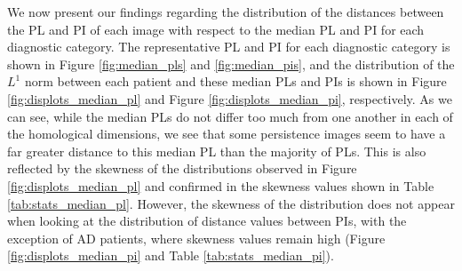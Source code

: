\documentclass{article}
\begin{document}
We now present our findings regarding the distribution of the distances between the PL and PI of
each image with respect to the median PL and PI for each diagnostic category. The representative PL
and PI for each diagnostic category is shown in Figure \ref{fig:median_pls} and
\ref{fig:median_pis}, and the distribution of the $L^1$ norm between each patient and these median
PLs and PIs is shown in Figure \ref{fig:displots_median_pl} and Figure \ref{fig:displots_median_pi},
respectively. As we can see, while the median PLs do not differ too much from one another in each of
the homological dimensions, we see that some persistence images seem to have a far greater distance to this
median PL than the majority of PLs. This is also reflected by the skewness of the distributions
observed in Figure \ref{fig:displots_median_pl} and confirmed in the skewness values shown in Table
\ref{tab:stats_median_pl}. However, the skewness of the distribution does not appear when looking at
the distribution of distance values between PIs, with the exception of AD patients, where skewness
values remain high (Figure \ref{fig:displots_median_pi} and Table \ref{tab:stats_median_pi}).
\end{document}
